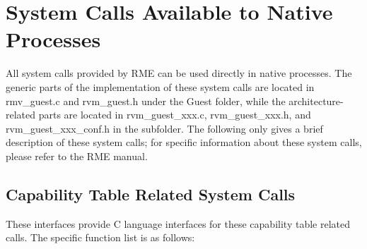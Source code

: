 \section{System Calls Available to Native Processes}\label{sec:3-5}

All system calls provided by RME can be used directly in native processes. The generic parts of the implementation of these system calls are located in rmv\_guest.c and rvm\_guest.h under the Guest folder, while the architecture-related parts are located in rvm\_guest\_xxx.c, rvm\_guest\_xxx.h, and rvm\_guest\_xxx\_conf.h in the subfolder. The following only gives a brief description of these system calls; for specific information about these system calls, please refer to the RME manual.

\subsection{Capability Table Related System Calls}\label{subsec:3-5-1}

These interfaces provide C language interfaces for these capability table related calls. The specific function list is as follows:

